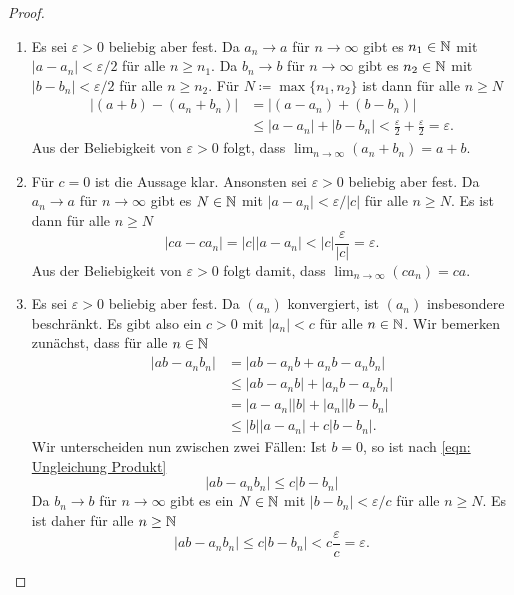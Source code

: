 \documentclass[a4paper,10pt]{article}
\begin{document}
\begin{proof}
 \begin{enumerate}
  \item
   Es sei $\varepsilon > 0$ beliebig aber fest. Da $a_n \to a$ für $n \to \infty$ gibt es $n_1 \in \mathbb{N}$ mit $|a - a_n| < \varepsilon/2$ für alle $n \geq n_1$. Da $b_n \to b$ für $n \to \infty$ gibt es $n_2 \in \mathbb{N}$ mit $|b - b_n| < \varepsilon/2$ für alle $n \geq n_2$. Für $N \coloneqq \max \{n_1, n_2\}$ ist dann für alle $n \geq N$
   \begin{align*}
    |(a + b) - (a_n + b_n)|
    &= |(a - a_n) + (b - b_n)| \\
    &\leq |a - a_n| + |b - b_n|
    < \frac{\varepsilon}{2} + \frac{\varepsilon}{2}
    = \varepsilon.
   \end{align*}
   Aus der Beliebigkeit von $\varepsilon > 0$ folgt, dass $\lim_{n \to \infty} (a_n + b_n) = a + b$.
  \item
   Für $c = 0$ ist die Aussage klar. Ansonsten sei $\varepsilon > 0$ beliebig aber fest. Da $a_n \to a$ für $n \to \infty$ gibt es $N \in \mathbb{N}$ mit $|a - a_n| < \varepsilon/|c|$ für alle $n \geq N$. Es ist dann für alle $n \geq N$
   \[
    |ca - ca_n|
    = |c| |a - a_n|
    < |c| \frac{\varepsilon}{|c|}
    = \varepsilon.
   \]
   Aus der Beliebigkeit von $\varepsilon > 0$ folgt damit, dass $\lim_{n \to \infty} (ca_n) = ca$.
  \item
   Es sei $\varepsilon > 0$ beliebig aber fest. Da $(a_n)$ konvergiert, ist $(a_n)$ insbesondere beschränkt. Es gibt also ein $c > 0$ mit $|a_n| < c$ für alle $n \in \mathbb{N}$. Wir bemerken zunächst, dass für alle $n \in \mathbb{N}$
   \begin{equation}\label{eqn: Ungleichung Produkt}
    \begin{aligned}
     |a b - a_n b_n|
     &= |a b - a_n b + a_n b - a_n b_n| \\
     &\leq |a b - a_n b| + |a_n b - a_n b_n| \\
     &= |a - a_n| |b| + |a_n| |b - b_n| \\
     &\leq |b| |a - a_n| + c |b - b_n|.
    \end{aligned}
   \end{equation}
   Wir unterscheiden nun zwischen zwei Fällen: Ist $b = 0$, so ist nach \eqref{eqn: Ungleichung Produkt}
   \[
    |a b - a_n b_n| \leq c |b - b_n|
   \]
   Da $b_n \to b$ für $n \to \infty$ gibt es ein $N \in \mathbb{N}$ mit $|b - b_n| < \varepsilon/c$ für alle $n \geq N$. Es ist daher für alle $n \geq \mathbb{N}$
   \[
    |a b - a_n b_n| \leq c |b - b_n| < c \frac{\varepsilon}{c} = \varepsilon.
\]
\end{enumerate}
\end{proof}
\end{document}
